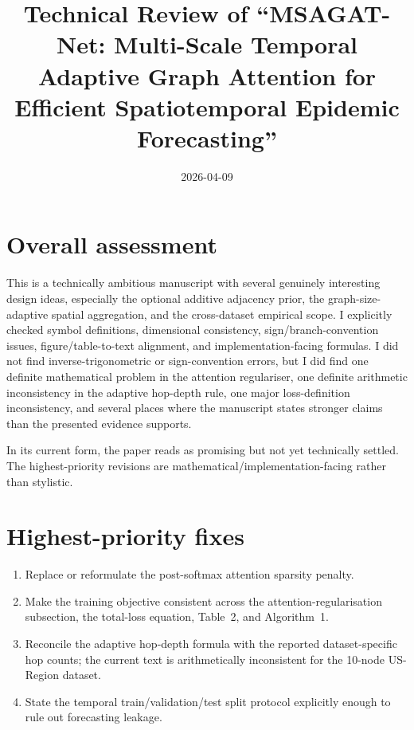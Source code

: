 \documentclass[11pt]{article}
\begin{document}
\title{Technical Review of ``MSAGAT-Net: Multi-Scale Temporal Adaptive Graph Attention for Efficient Spatiotemporal Epidemic Forecasting''}
\author{}
\date{2026-04-09}
\maketitle

\section*{Overall assessment}

This is a technically ambitious manuscript with several genuinely interesting design ideas, especially the optional additive adjacency prior, the graph-size-adaptive spatial aggregation, and the cross-dataset empirical scope. I explicitly checked symbol definitions, dimensional consistency, sign/branch-convention issues, figure/table-to-text alignment, and implementation-facing formulas. I did not find inverse-trigonometric or sign-convention errors, but I did find one definite mathematical problem in the attention regulariser, one definite arithmetic inconsistency in the adaptive hop-depth rule, one major loss-definition inconsistency, and several places where the manuscript states stronger claims than the presented evidence supports.

In its current form, the paper reads as promising but not yet technically settled. The highest-priority revisions are mathematical/implementation-facing rather than stylistic.

\section*{Highest-priority fixes}

\begin{enumerate}
\item Replace or reformulate the post-softmax attention sparsity penalty.
\item Make the training objective consistent across the attention-regularisation subsection, the total-loss equation, Table~2, and Algorithm~1.
\item Reconcile the adaptive hop-depth formula with the reported dataset-specific hop counts; the current text is arithmetically inconsistent for the 10-node US-Region dataset.
\item State the temporal train/validation/test split protocol explicitly enough to rule out forecasting leakage.
\end{enumerate}
\end{document}
